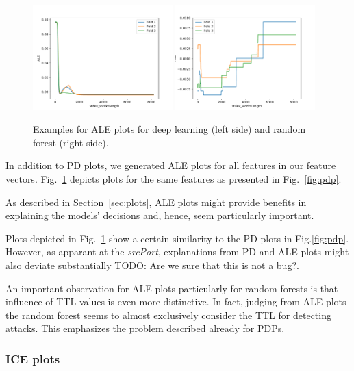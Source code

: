 \documentclass[10pt,sigconf,letterpaper]{acmart}
\newcommand\note[2]{{\color{#1}#2}}
\newcommand\todo[1]{{\note{red}{TODO: #1}}}
\begin{document}
\begin{figure}[p]
\includegraphics[width=0.48\textwidth]{../ale/apply(stdev(ipTotalLength),forward)_nn.pdf}
\includegraphics[width=0.48\textwidth]{../ale/apply(stdev(ipTotalLength),forward)_rf.pdf}

\caption{Examples for ALE plots for deep learning (left side) and random forest (right side).}
\label{fig:ale}
\end{figure}

In addition to PD plots, we generated ALE plots for all features in our feature vectors. Fig.~\ref{fig:ale} depicts plots for the same features as presented in Fig.~\ref{fig:pdp}.

As described in Section~\ref{sec:plots}, ALE plots might provide benefits in explaining the models' decisions and, hence, seem particularly important.

Plots depicted in Fig.~\ref{fig:ale} show a certain similarity to the PD plots in Fig.\ref{fig:pdp}. However, as apparant at the \textit{srcPort}, explanations from PD and ALE plots might also deviate substantially \todo{Are we sure that this is not a bug?}. 

An important observation for ALE plots particularly for random forests is that influence of TTL values is even more distinctive. In fact, judging from ALE plots the random forest seems to almost exclusively consider the TTL for detecting attacks. This emphasizes the problem described already for PDPs.

\subsubsection{ICE plots}
\end{document}
